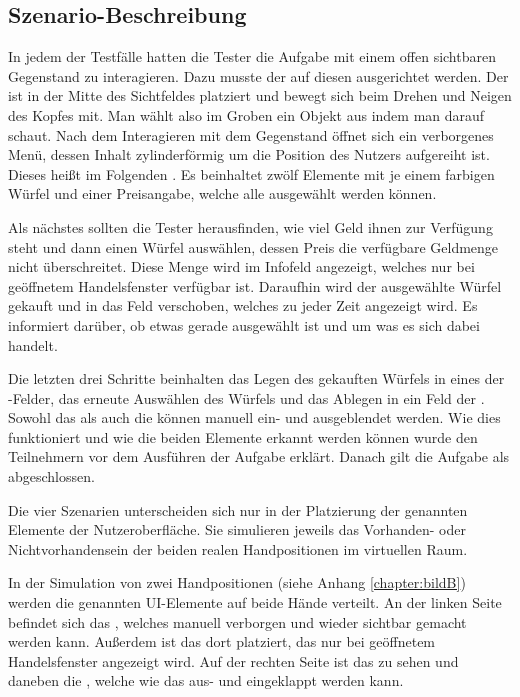 		\subsection{Szenario-Beschreibung}\label{chapter:szenario}
			In jedem der Testfälle hatten die Tester die Aufgabe mit einem offen sichtbaren Gegenstand zu interagieren. Dazu musste der  auf diesen ausgerichtet werden. Der  ist in der Mitte des Sichtfeldes platziert und bewegt sich beim Drehen und Neigen des Kopfes mit. Man wählt also im Groben ein Objekt aus indem man darauf schaut.
			Nach dem Interagieren mit dem Gegenstand öffnet sich ein verborgenes Menü, dessen Inhalt zylinderförmig um die Position des Nutzers aufgereiht ist. Dieses heißt im Folgenden . Es beinhaltet zwölf Elemente mit je einem farbigen Würfel und einer Preisangabe, welche alle ausgewählt werden können.
			
			Als nächstes sollten die Tester herausfinden, wie viel Geld ihnen zur Verfügung steht und dann einen Würfel auswählen, dessen Preis die verfügbare Geldmenge nicht überschreitet. Diese Menge wird im Infofeld  angezeigt, welches nur bei geöffnetem Handelsfenster verfügbar ist.
			Daraufhin wird der ausgewählte Würfel gekauft und in das Feld  verschoben, welches zu jeder Zeit angezeigt wird. Es informiert darüber, ob etwas gerade ausgewählt ist und um was es sich dabei handelt.
			
			Die letzten drei Schritte beinhalten das Legen des gekauften Würfels in eines der -Felder, das erneute Auswählen des Würfels und das Ablegen in ein Feld der . Sowohl das  als auch die  können manuell ein- und ausgeblendet werden. Wie dies funktioniert und wie die beiden Elemente erkannt werden können wurde den Teilnehmern vor dem Ausführen der Aufgabe erklärt.
			Danach gilt die Aufgabe als abgeschlossen.
			
			Die vier Szenarien unterscheiden sich nur in der Platzierung der genannten Elemente der Nutzeroberfläche. Sie simulieren jeweils das Vorhanden- oder Nichtvorhandensein der beiden realen Handpositionen im virtuellen Raum.
			
			
			In der Simulation von zwei Handpositionen (siehe Anhang \ref{chapter:bildB}) werden die genannten UI-Elemente auf beide Hände verteilt. An der linken Seite befindet sich das , welches manuell verborgen und wieder sichtbar gemacht werden kann. Außerdem ist das  dort platziert, das nur bei geöffnetem Handelsfenster angezeigt wird. Auf der rechten Seite ist das  zu sehen und daneben die , welche wie das  aus- und eingeklappt werden kann.
			
